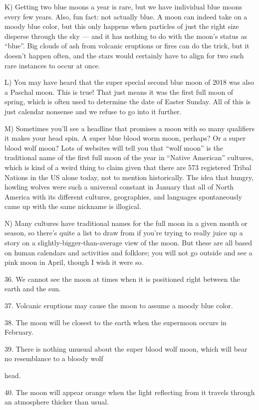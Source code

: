 \documentclass[UTF8,11pt]{ctexart}
\begin{document}
K) Getting two blue moons a year is rare, but we have individual blue moons every few years. Also, fun fact: not actually blue. A moon can indeed take on a moody blue color, but this only happens when particles of just the right size disperse through the sky — and it has nothing to do with the moon’s status as “blue”. Big clouds of ash from volcanic eruptions or fires can do the trick, but it doesn’t happen often, and the stars would certainly have to align for two such rare instances to occur at once.


L) You may have heard that the super special second blue moon of 2018 was also a Paschal moon. This is true! That just means it was the first full moon of spring, which is often used to determine the date of Easter Sunday. All of this is just calendar nonsense and we refuse to go into it further.


M) Sometimes you’ll see a headline that promises a moon with so many qualifiers it makes your head spin. A super blue blood worm moon, perhaps? Or a super blood wolf moon? Lots of websites will tell you that “wolf moon” is the traditional name of the first full moon of the year in “Native American” cultures, which is kind of a weird thing to claim given that there are 573 registered Tribal Nations in the US alone today, not to mention historically. The idea that hungry, howling wolves were such a universal constant in January that all of North America with its different cultures, geographies, and languages spontaneously came up with the same nickname is illogical.


N) Many cultures have traditional names for the full moon in a given month or season, so there’s quite a list to draw from if you’re trying to really juice up a story on a slightly-bigger-than-average view of the moon. But these are all based on human calendars and activities and folklore; you will not go outside and see a pink moon in April, though I wish it were so.


36. We cannot see the moon at times when it is positioned right between the earth and the sun.


37. Volcanic eruptions may cause the moon to assume a moody blue color.


38. The moon will be closest to the earth when the supermoon occurs in February.


39. There is nothing unusual about the super blood wolf moon, which will bear no resemblance to a bloody wolf


head.


40. The moon will appear orange when the light reflecting from it travels through an atmosphere thicker than usual.
\end{document}
